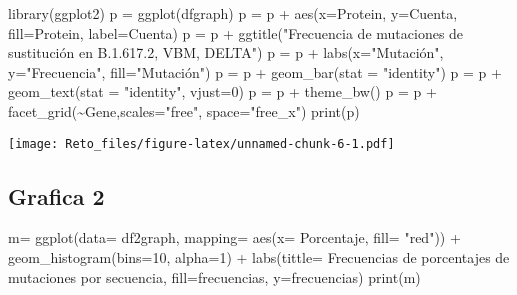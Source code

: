 \documentclass[
]{article}
\newenvironment{Shaded}{\begin{snugshade}}{\end{snugshade}}
\newcommand{\AttributeTok}[1]{\textcolor[rgb]{0.77,0.63,0.00}{#1}}
\newcommand{\DecValTok}[1]{\textcolor[rgb]{0.00,0.00,0.81}{#1}}
\newcommand{\FunctionTok}[1]{\textcolor[rgb]{0.00,0.00,0.00}{#1}}
\newcommand{\NormalTok}[1]{#1}
\newcommand{\OtherTok}[1]{\textcolor[rgb]{0.56,0.35,0.01}{#1}}
\newcommand{\SpecialCharTok}[1]{\textcolor[rgb]{0.00,0.00,0.00}{#1}}
\newcommand{\StringTok}[1]{\textcolor[rgb]{0.31,0.60,0.02}{#1}}
\begin{document}
\begin{Shaded}
\begin{Highlighting}[]
\FunctionTok{library}\NormalTok{(ggplot2)}
\NormalTok{p }\OtherTok{=} \FunctionTok{ggplot}\NormalTok{(dfgraph)}
\NormalTok{p }\OtherTok{=}\NormalTok{ p }\SpecialCharTok{+} \FunctionTok{aes}\NormalTok{(}\AttributeTok{x=}\NormalTok{Protein, }\AttributeTok{y=}\NormalTok{Cuenta, }\AttributeTok{fill=}\NormalTok{Protein, }\AttributeTok{label=}\NormalTok{Cuenta)}
\NormalTok{p }\OtherTok{=}\NormalTok{ p }\SpecialCharTok{+} \FunctionTok{ggtitle}\NormalTok{(}\StringTok{"Frecuencia de mutaciones de sustitución en B.1.617.2, VBM, DELTA"}\NormalTok{)}
\NormalTok{p }\OtherTok{=}\NormalTok{ p }\SpecialCharTok{+} \FunctionTok{labs}\NormalTok{(}\AttributeTok{x=}\StringTok{"Mutación"}\NormalTok{, }\AttributeTok{y=}\StringTok{"Frecuencia"}\NormalTok{, }\AttributeTok{fill=}\StringTok{"Mutación"}\NormalTok{)}
\NormalTok{p }\OtherTok{=}\NormalTok{ p }\SpecialCharTok{+} \FunctionTok{geom\_bar}\NormalTok{(}\AttributeTok{stat =} \StringTok{"identity"}\NormalTok{)}
\NormalTok{p }\OtherTok{=}\NormalTok{ p }\SpecialCharTok{+} \FunctionTok{geom\_text}\NormalTok{(}\AttributeTok{stat =} \StringTok{"identity"}\NormalTok{, }\AttributeTok{vjust=}\DecValTok{0}\NormalTok{)}
\NormalTok{p }\OtherTok{=}\NormalTok{ p }\SpecialCharTok{+} \FunctionTok{theme\_bw}\NormalTok{()}
\NormalTok{p }\OtherTok{=}\NormalTok{ p }\SpecialCharTok{+} \FunctionTok{facet\_grid}\NormalTok{(}\SpecialCharTok{\textasciitilde{}}\NormalTok{Gene,}\AttributeTok{scales=}\StringTok{"free"}\NormalTok{, }\AttributeTok{space=}\StringTok{"free\_x"}\NormalTok{)}
\FunctionTok{print}\NormalTok{(p)}
\end{Highlighting}
\end{Shaded}

\texttt{[image: Reto\_files/figure-latex/unnamed-chunk-6-1.pdf]}

\hypertarget{grafica-2}{%
\subsection{Grafica 2}\label{grafica-2}}

\begin{Shaded}
\begin{Highlighting}[]
\NormalTok{m}\OtherTok{=} \FunctionTok{ggplot}\NormalTok{(}\AttributeTok{data=}\NormalTok{ df2graph,}
       \AttributeTok{mapping=} \FunctionTok{aes}\NormalTok{(}\AttributeTok{x=}\NormalTok{ Porcentaje, }\AttributeTok{fill=} \StringTok{"red"}\NormalTok{)) }\SpecialCharTok{+}
         \FunctionTok{geom\_histogram}\NormalTok{(}\AttributeTok{bins=}\DecValTok{10}\NormalTok{, }\AttributeTok{alpha=}\DecValTok{1}\NormalTok{) }\SpecialCharTok{+}
        \FunctionTok{labs}\NormalTok{(}\AttributeTok{tittle=} \StringTok{\textquotesingle{}Frecuencias de porcentajes de mutaciones por secuencia\textquotesingle{}}\NormalTok{,}
             \AttributeTok{fill=}\StringTok{\textquotesingle{}frecuencias\textquotesingle{}}\NormalTok{,}
             \AttributeTok{y=}\StringTok{\textquotesingle{}frecuencias\textquotesingle{}}\NormalTok{)}
\FunctionTok{print}\NormalTok{(m)}
\end{Highlighting}
\end{Shaded}
\end{document}
